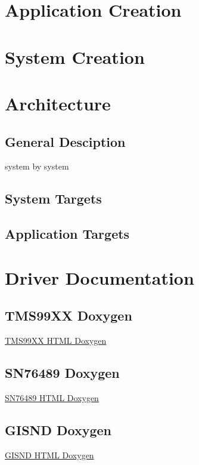 \documentclass{article}
\begin{document}
  \newpage

  \section{Application Creation}

  \newpage

  \section{System Creation}

  \newpage

  \section{Architecture}
  \subsection{General Desciption}

  \par
  system by system

  \subsection{System Targets}

  \newpage

  \subsection{Application Targets}

  \section{Driver Documentation}

  \subsection{TMS99XX Doxygen}
  \href{https://sparkletron.github.io/RODAC/manual/dox/tms99XX/html/index.html}{TMS99XX HTML Doxygen}

  \subsection{SN76489 Doxygen}
  \href{https://sparkletron.github.io/RODAC/manual/dox/sn76489/html/index.html}{SN76489 HTML Doxygen}

  \subsection{GISND Doxygen}
  \href{https://sparkletron.github.io/RODAC/manual/dox/gisnd/html/index.html}{GISND HTML Doxygen}
\end{document}
